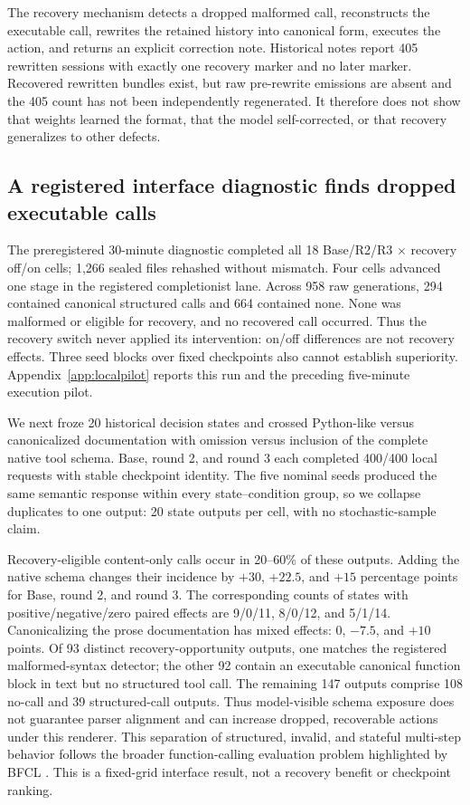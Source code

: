 \documentclass[11pt,a4paper]{article}
\begin{document}
The recovery mechanism detects a dropped malformed call, reconstructs the
executable call, rewrites the retained history into canonical form, executes the
action, and returns an explicit correction note. Historical notes report 405
rewritten sessions with exactly one recovery marker and no later marker.
Recovered rewritten bundles exist, but raw pre-rewrite emissions are absent and
the 405 count has not been independently regenerated. It therefore does not show
that weights learned the format, that the model self-corrected, or that recovery
generalizes to other defects.

\subsection{A registered interface diagnostic finds dropped executable calls}

The preregistered 30-minute diagnostic completed all 18 Base/R2/R3
$\times$ recovery off/on cells; 1,266 sealed files rehashed without mismatch.
Four cells advanced one stage in the registered completionist lane. Across 958 raw generations, 294
contained canonical structured calls and 664 contained none. None was malformed
or eligible for recovery, and no recovered call occurred. Thus the recovery
switch never applied its intervention: on/off differences are not recovery
effects. Three seed blocks over fixed checkpoints also cannot establish
superiority. Appendix~\ref{app:localpilot} reports this run and the preceding
five-minute execution pilot.

We next froze 20 historical decision states and crossed Python-like versus
canonicalized documentation with omission versus inclusion of the complete
native tool schema. Base, round 2, and round 3 each completed 400/400 local
requests with stable checkpoint identity. The five nominal seeds produced the
same semantic response within every state--condition group, so we collapse
duplicates to one output: 20 state outputs per cell, with no stochastic-sample
claim.

Recovery-eligible content-only calls occur in 20--60\% of these outputs. Adding
the native schema changes their incidence by $+30$, $+22.5$, and $+15$
percentage points for Base, round 2, and round 3. The corresponding counts of
states with positive/negative/zero paired effects are 9/0/11, 8/0/12, and
5/1/14. Canonicalizing the prose documentation has mixed effects: 0, $-7.5$,
and $+10$ points. Of 93 distinct recovery-opportunity outputs, one matches the
registered malformed-syntax detector; the other 92 contain an executable
canonical function block in text but no structured tool call. The remaining
147 outputs comprise 108 no-call and 39 structured-call outputs. Thus
model-visible schema exposure
does not guarantee parser alignment and can increase dropped, recoverable
actions under this renderer. This separation of structured, invalid, and
stateful multi-step behavior follows the broader function-calling evaluation
problem highlighted by BFCL \citep{patil2025bfcl}. This is a fixed-grid interface result, not a
recovery benefit or checkpoint ranking.
\end{document}
